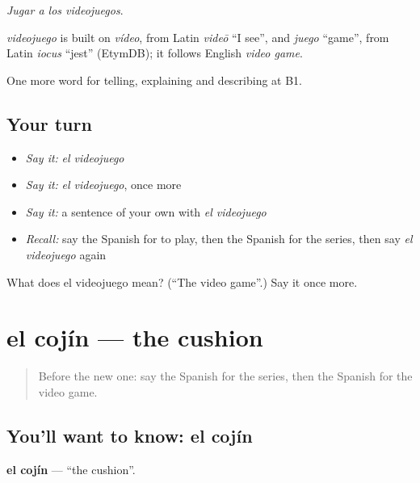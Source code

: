 \emph{Jugar a los videojuegos}.

\begin{cousinweb}
\emph{videojuego} is built on \emph{vídeo}, from Latin \emph{videō} \textquotedblleft{}I see\textquotedblright{}, and \emph{juego} \textquotedblleft{}game\textquotedblright{}, from Latin \emph{iocus} \textquotedblleft{}jest\textquotedblright{} (EtymDB); it follows English \emph{video game}.
\end{cousinweb}

\begin{grammarlens}[title={What you've built}]
One more word for telling, explaining and describing at B1.
\end{grammarlens}

\subsection*{Your turn}
\begin{itemize}
\raggedright
  \item \emph{Say it:} \emph{el videojuego}
  \item \emph{Say it:} \emph{el videojuego}, once more
  \item \emph{Say it:} a sentence of your own with \emph{el videojuego}
  \item \emph{Recall:} say the Spanish for to play, then the Spanish for the series, then say \emph{el videojuego} again
\end{itemize}

\begin{tcolorbox}[breakable,colback=teal!4,colframe=teal!35!black,title={Before you move on}]
What does el videojuego mean? (\textquotedblleft{}The video game\textquotedblright{}.) Say it once more.
\end{tcolorbox}
\section[el cojín]{el cojín — the cushion}

\label{lesson:ES-C761-cojin}



\begin{quote}
Before the new one: say the Spanish for the series, then the Spanish for the video game.
\end{quote}

\subsection*{You'll want to know: el cojín}
\textbf{el cojín} — \textquotedblleft{}the cushion\textquotedblright{}.

